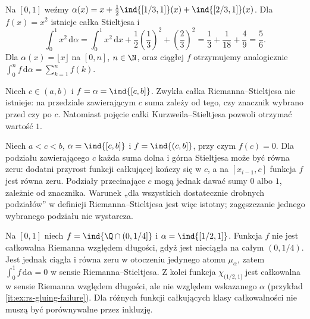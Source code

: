 \begin{przyklad}
Na $[0,1]$ weźmy $\alpha(x)=x+\tfrac12\ind{[1/3,1]}(x)+\ind{[2/3,1]}(x)$. Dla $f(x)=x^2$ istnieje całka Stieltjesa i
\[
\int_0^1x^2\,\mathrm d\alpha=\int_0^1x^2\,\mathrm dx+\frac12\left(\frac13\right)^2+\left(\frac23\right)^2=\frac13+\frac1{18}+\frac49=\frac56.
\]
Dla $\alpha(x)=\lfloor x\rfloor$ na $[0,n]$, $n\in\N$, oraz ciągłej $f$ otrzymujemy analogicznie $\int_0^n f\,\mathrm d\alpha=\sum_{k=1}^n f(k)$.
\end{przyklad}
\begin{przyklad}
Niech $c\in(a,b)$ i $f=\alpha=\ind{[c,b]}$. Zwykła całka Riemanna--Stieltjesa nie istnieje: na przedziale zawierającym $c$ suma zależy od tego, czy znacznik wybrano przed czy po $c$. Natomiast pojęcie całki Kurzweila--Stieltjesa pozwoli otrzymać wartość $1$.
\end{przyklad}
\begin{przyklad}
Niech $a<c<b$, $\alpha=\ind{[c,b]}$ i $f=\ind{(c,b]}$, przy czym $f(c)=0$. Dla podziału zawierającego $c$ każda suma dolna i górna Stieltjesa może być równa zeru: dodatni przyrost funkcji całkującej kończy się w $c$, a na $[x_{i-1},c]$ funkcja $f$ jest równa zeru. Podziały przecinające $c$ mogą jednak dawać sumy $0$ albo $1$, zależnie od znacznika. Warunek „dla wszystkich dostatecznie drobnych podziałów” w definicji Riemanna--Stieltjesa jest więc istotny; zagęszczanie jednego wybranego podziału nie wystarcza.
\end{przyklad}
\begin{przyklad}
Na $[0,1]$ niech $f=\ind{\Q\cap(0,1/4]}$ i $\alpha=\ind{[1/2,1]}$. Funkcja $f$ nie jest całkowalna Riemanna względem długości, gdyż jest nieciągła na całym $(0,1/4)$. Jest jednak ciągła i równa zeru w otoczeniu jedynego atomu $\mu_\alpha$, zatem $\int_0^1 f\,\mathrm d\alpha=0$ w sensie Riemanna--Stieltjesa. Z kolei funkcja $\chi_{(1/2,1]}$ jest całkowalna w sensie Riemanna względem długości, ale nie względem wskazanego $\alpha$ (przykład \ref{it:ex:rs-gluing-failure}). Dla różnych funkcji całkujących klasy całkowalności nie muszą być porównywalne przez inkluzję.
\end{przyklad}

